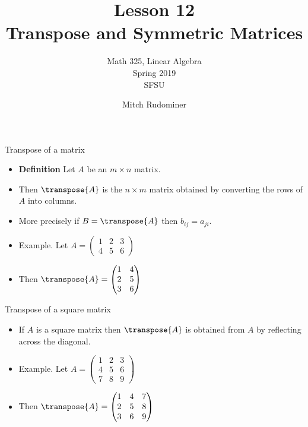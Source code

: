 \documentclass{beamer}
\title{Lesson 12 \\ Transpose and Symmetric Matrices}
\subtitle{Math 325, Linear Algebra \\ Spring 2019 \\ SFSU}
\author{Mitch Rudominer}
\date{}
\begin{document}
\begin{frame}
  \titlepage
\end{frame}


\begin{frame}{Transpose of a matrix}
\begin{itemize}
\item \textbf{Definition} Let $A$ be an $m\times n$ matrix.
\item Then $\transpose{A}$ is the $n\times m$ matrix obtained by
converting the rows of $A$ into columns.
\item More precisely if $B=\transpose{A}$ then $b_{ij} = a_{ji}$.
\item Example. Let
$
A=
\begin{pmatrix}
1 & 2 & 3 \\
4 & 5 & 6
\end{pmatrix}
$
\item Then
$
\transpose{A} =
\begin{pmatrix}
1 & 4 \\
2 & 5 \\
3 & 6 \\
\end{pmatrix}
$
\end{itemize}
\end{frame}


\begin{frame}{Transpose of a square matrix}
\begin{itemize}
\item If $A$ is a square matrix then $\transpose{A}$ is obtained from $A$
by reflecting across the diagonal.
\item Example. Let
$
A=
\begin{pmatrix}
1 & 2 & 3 \\
4 & 5 & 6 \\
7 & 8 & 9
\end{pmatrix}
$
\item Then
$
\transpose{A} =
\begin{pmatrix}
1 & 4  & 7 \\
2 & 5  & 8\\
3 & 6  & 9\\
\end{pmatrix}
$
\end{itemize}
\end{frame}
\end{document}
